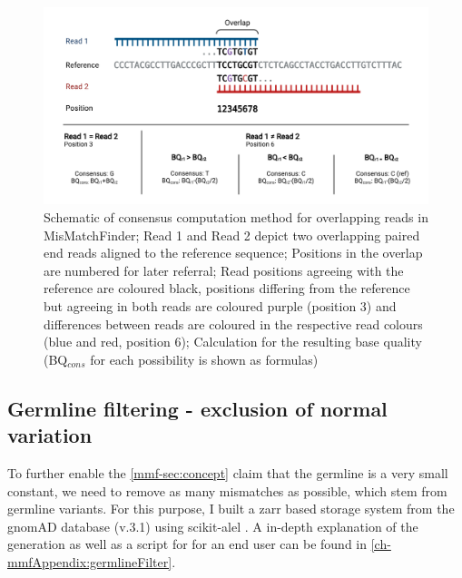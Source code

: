 \begin{figure}[!ht]
\centering
\includegraphics[width=.99\linewidth]{Figures/ConsensusMethodMisMatchFinder.pdf}
\caption[Schematic of consensus computation method for overlapping reads]{Schematic of consensus computation method for overlapping reads in MisMatchFinder; Read 1 and Read 2 depict two overlapping paired end reads aligned to the reference sequence; Positions in the overlap are numbered for later referral; Read positions agreeing with the reference are coloured black, positions differing from the reference but agreeing in both reads are coloured purple (position 3) and differences between reads are coloured in the respective read colours (blue and red, position 6); Calculation for the resulting base quality (BQ$_{cons}$ for each possibility is shown as formulas)}\label{fig:mmf-consensus}
\end{figure}

\subsection[Germline filtering]{Germline filtering - exclusion of normal variation}
\label{mmf-sec:germline}

To further enable the \autoref{mmf-sec:concept} claim that the germline is a very small constant, we need to remove as many mismatches as possible, which stem from germline variants. For this purpose, I built a zarr \cite{Miles2021} based storage system from the gnomAD database (v.3.1) \cite{Karczewski2020} using scikit-alel \cite{Miles2021a}.
A in-depth explanation of the generation as well as a script for for an end user can be found in \autoref{ch-mmfAppendix:germlineFilter}.

